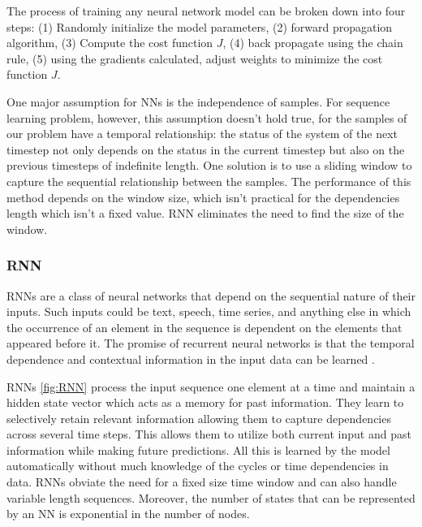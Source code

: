 \documentclass[5p]{elsarticle}
\begin{document}
The process of training any neural network model can be broken down into four steps: (1) Randomly initialize the model parameters, (2) forward propagation algorithm, (3) Compute the cost function $J$, (4) back propagate using the chain rule, (5) using the gradients calculated, adjust weights to minimize the cost function $J$.

One major assumption for NNs is the independence of samples. For sequence learning problem, however, this assumption doesn't hold true, for the samples of our problem have a temporal relationship: the status of the system of the next timestep not only depends on the status in the current timestep but also on the previous timesteps of indefinite length. One solution is to use a sliding window to capture the sequential relationship between the samples. The performance of this method depends on the window size, which isn't practical for the dependencies length which isn't a fixed value. RNN eliminates the need to find the size of the window\cite{HermansTrainingNetworks}. 

\subsubsection{RNN}

RNNs are a class of neural networks that depend on the sequential nature of their inputs. Such inputs could be text, speech, time series, and anything else in which the occurrence of an element in the sequence is dependent on the elements that appeared before it. The promise of recurrent neural networks is that the temporal dependence and contextual information in the input data can be learned\cite{Bengio1994LearningDifficult} \cite{ChoLearningTranslation}. 

RNNs \ref{fig:RNN} process the input sequence one element at a time and maintain a hidden
state vector which acts as a memory for past information. They learn to selectively retain relevant information allowing them to capture dependencies across several time steps. This allows them to utilize both current input and past information while making future predictions. All this is learned by the model automatically without much knowledge of the cycles or time dependencies in data. RNNs obviate the need for a fixed size time window and can also handle variable length sequences. Moreover, the number of states that can be represented by an NN is exponential in the number of nodes.
\end{document}
